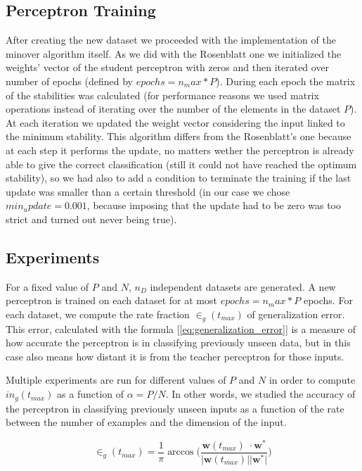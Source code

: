\subsection{Perceptron Training}
After creating the new dataset we proceeded with the implementation of the minover algorithm itself. As we did with the Rosenblatt one
we initialized the weights' vector of the student perceptron with zeros and then iterated over number of epochs (defined by $epochs = n_max * P$).
During each epoch the matrix of the stabilities was calculated (for performance reasons we used matrix operations instead of iterating over the
number of the elements in the dataset $P$). At each iteration we updated the weight vector considering the input linked to the minimum stability.
This algorithm differs from the Rosenblatt's one because at each step it performs the update, no matters wether the perceptron is already able to give
the correct classification (still it could not have reached the optimum stability), so we had also to add a condition to terminate the training if the
last update was smaller than a certain threshold (in our case we chose $min_update = 0.001$, because imposing that the update had to be zero was too
strict and turned out never being true).


\subsection{Experiments}
For a fixed value of $P$ and $N$, $n_D$ independent datasets are generated. A new perceptron is trained on each dataset for at most $epochs = n_max * P$ epochs.
For each dataset, we compute the rate fraction $\in_g(t_{max})$ of generalization error. This error, calculated with the formula [\ref{eq:generalization_error}]
is a measure of how accurate the perceptron is in classifying previously unseen data, but in this case also means how distant it is from the teacher perceptron for those inputs.

Multiple experiments are run for different values of $P$ and $N$ in order to compute $in_g(t_{max})$ as a function of $\alpha = P / N$.
In other words, we studied the accuracy of the perceptron in classifying previously unseen inputs as a function of the rate between the number of examples and the dimension of the input.


\begin{equation} \label{eq:generalization_error}
    \in_g(t_{max}) = \frac{1}{\pi} \arccos \bigg(\frac{\mathsf{\bm{w}}(t_{max})\;\cdotp \mathsf{\bm{w}}^*}{\lvert \mathsf{\bm{w}}(t_{max}) \rvert \lvert \mathsf{\bm{w}}^* \rvert} \bigg)
\end{equation}

